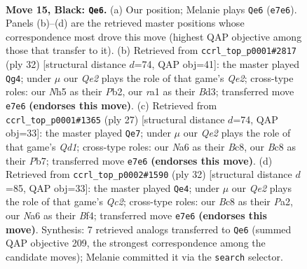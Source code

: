 \documentclass[11pt]{article}
\begin{document}
\begin{figure}[p]
\label{fig:thought-m27}
\end{figure}

\clearpage

\begin{figure}[p]\centering
\begin{subfigure}{0.46\textwidth}\centering
\resizebox{\linewidth}{!}{%
\newchessgame
\chessboard[
  setfen={r1b2rk1/pp2q1pp/n2b4/P2Q1p1n/8/1P2PNP1/5PB1/RNB2RK1 b - - 0 15},
  showmover=false,
  pgfstyle=straightmove, color=movearrow, markmove={e7-e6}
]}
\caption{}
\end{subfigure}\hfill
\begin{subfigure}{0.46\textwidth}\centering
\resizebox{\linewidth}{!}{%
\newchessgame
\chessboard[
  setfen={2krb2r/1ppn1ppp/p3p3/3q4/2NP4/2PB4/PP2QPPP/1K1R3R w - - 3 17},
  showmover=false,
  pgfstyle=straightmove, color=movearrow, markmove={e2-g4}
]}
\caption{}
\end{subfigure}
\\[4pt]
\begin{subfigure}{0.46\textwidth}\centering
\resizebox{\linewidth}{!}{%
\newchessgame
\chessboard[
  setfen={r1bq1rk1/pp3ppp/3b1n2/1P2p3/2B5/4PN1P/P4PP1/R1BQ1RK1 b - - 0 14},
  showmover=false,
  pgfstyle=straightmove, color=movearrow, markmove={d8-e7}
]}
\caption{}
\end{subfigure}\hfill
\begin{subfigure}{0.46\textwidth}\centering
\resizebox{\linewidth}{!}{%
\newchessgame
\chessboard[
  setfen={rn3r1k/p3bppB/bpp1p3/2q1N3/5B2/6P1/P1Q1PP1P/R4RK1 w - - 1 17},
  showmover=false,
  pgfstyle=straightmove, color=movearrow, markmove={c2-e4}
]}
\caption{}
\end{subfigure}
\caption{\textbf{Move 15, Black: \texttt{Qe6}.} (a) Our position; Melanie plays \texttt{Qe6} (\texttt{e7e6}). Panels (b)--(d) are the retrieved master positions whose correspondence most drove this move (highest QAP objective among those that transfer to it). (b) Retrieved from \texttt{ccrl\_top\_p0001\#2817} (ply 32) [structural distance $d$=74, QAP obj=41]: the master played \texttt{Qg4}; under $\mu$ our \emph{Qe2} plays the role of that game's \emph{Qe2}; cross-type roles: our \emph{N}h5 as their \emph{P}b2, our \emph{r}a1 as their \emph{B}d3; transferred move \texttt{e7e6} \textbf{(endorses this move)}. (c) Retrieved from \texttt{ccrl\_top\_p0001\#1365} (ply 27) [structural distance $d$=74, QAP obj=33]: the master played \texttt{Qe7}; under $\mu$ our \emph{Qe2} plays the role of that game's \emph{Qd1}; cross-type roles: our \emph{N}a6 as their \emph{B}c8, our \emph{B}c8 as their \emph{P}b7; transferred move \texttt{e7e6} \textbf{(endorses this move)}. (d) Retrieved from \texttt{ccrl\_top\_p0002\#1590} (ply 32) [structural distance $d$=85, QAP obj=33]: the master played \texttt{Qe4}; under $\mu$ our \emph{Qe2} plays the role of that game's \emph{Qc2}; cross-type roles: our \emph{B}c8 as their \emph{P}a2, our \emph{N}a6 as their \emph{B}f4; transferred move \texttt{e7e6} \textbf{(endorses this move)}. Synthesis: 7 retrieved analogs transferred to \texttt{Qe6} (summed QAP objective 209, the strongest correspondence among the candidate moves); Melanie committed it via the \texttt{search} selector.}

\end{figure}
\end{document}
